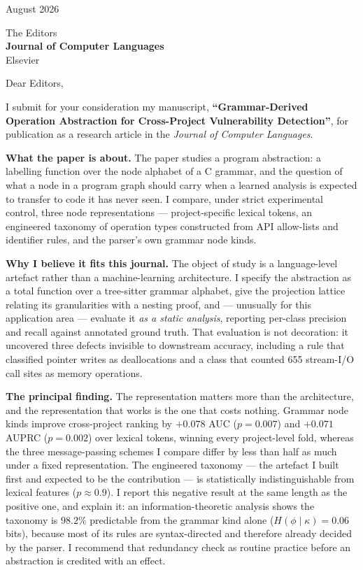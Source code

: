 \documentclass[11pt]{article}
\begin{document}
 August 2026

\vspace{1em}

\noindent The Editors\\
\textbf{Journal of Computer Languages}\\
Elsevier

\vspace{1.5em}

\noindent Dear Editors,

I submit for your consideration my manuscript, \textbf{``Grammar-Derived Operation Abstraction for Cross-Project Vulnerability Detection''}, for publication as a research article in the \emph{Journal of Computer Languages}.

\vspace{1em}
\noindent\textbf{What the paper is about.}
The paper studies a program abstraction: a labelling function over the node alphabet of a C grammar, and the question of what a node in a program graph should carry when a learned analysis is expected to transfer to code it has never seen. I compare, under strict experimental control, three node representations --- project-specific lexical tokens, an engineered taxonomy of operation types constructed from API allow-lists and identifier rules, and the parser's own grammar node kinds.

\vspace{1em}
\noindent\textbf{Why I believe it fits this journal.}
The object of study is a language-level artefact rather than a machine-learning architecture. I specify the abstraction as a total function over a tree-sitter grammar alphabet, give the projection lattice relating its granularities with a nesting proof, and --- unusually for this application area --- evaluate it \emph{as a static analysis}, reporting per-class precision and recall against annotated ground truth. That evaluation is not decoration: it uncovered three defects invisible to downstream accuracy, including a rule that classified pointer writes as deallocations and a class that counted 655 stream-I/O call sites as memory operations.

\vspace{1em}
\noindent\textbf{The principal finding.}
The representation matters more than the architecture, and the representation that works is the one that costs nothing. Grammar node kinds improve cross-project ranking by $+0.078$ AUC ($p = 0.007$) and $+0.071$ AUPRC ($p = 0.002$) over lexical tokens, winning every project-level fold, whereas the three message-passing schemes I compare differ by less than half as much under a fixed representation. The engineered taxonomy --- the artefact I built first and expected to be the contribution --- is statistically indistinguishable from lexical features ($p \approx 0.9$). I report this negative result at the same length as the positive one, and explain it: an information-theoretic analysis shows the taxonomy is $98.2\%$ predictable from the grammar kind alone ($H(\phi \mid \kappa) = 0.06$ bits), because most of its rules are syntax-directed and therefore already decided by the parser. I recommend that redundancy check as routine practice before an abstraction is credited with an effect.
\end{document}
